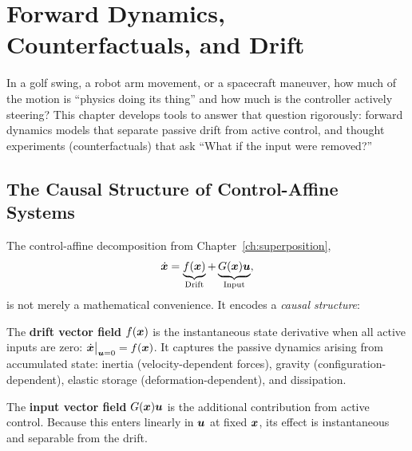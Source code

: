 \chapter{Forward Dynamics, Counterfactuals, and Drift}
\label{ch:counterfactuals}

\begin{laymansbox}
In a golf swing, a robot arm movement, or a spacecraft maneuver, how much of the motion
is ``physics doing its thing'' and how much is the controller actively steering? This
chapter develops tools to answer that question rigorously: forward dynamics models that
separate passive drift from active control, and thought experiments (counterfactuals) that
ask ``What if the input were removed?''
\end{laymansbox}

\section{The Causal Structure of Control-Affine Systems}

The control-affine decomposition from Chapter~\ref{ch:superposition},
\begin{equation}
\dot{\bm{x}} = \underbrace{f(\bm{x})}_{\text{Drift}} + \underbrace{G(\bm{x})\bm{u}}_{\text{Input}},
\label{eq:ch7:affine}
\end{equation}
is not merely a mathematical convenience. It encodes a \emph{causal structure}:

\begin{definition}[Drift]\label{def:ch7:drift}
The \textbf{drift vector field} $f(\bm{x})$ is the instantaneous state derivative when all
active inputs are zero: $\dot{\bm{x}}\big|_{\bm{u}=0} = f(\bm{x})$. It captures the passive dynamics
arising from accumulated state: inertia (velocity-dependent forces), gravity (configuration-dependent),
elastic storage (deformation-dependent), and dissipation.
\end{definition}

\begin{definition}[Input]\label{def:ch7:input}
The \textbf{input vector field} $G(\bm{x})\bm{u}$ is the additional contribution from active
control. Because this enters linearly in $\bm{u}$ at fixed $\bm{x}$, its effect is instantaneous
and separable from the drift.
\end{definition}

